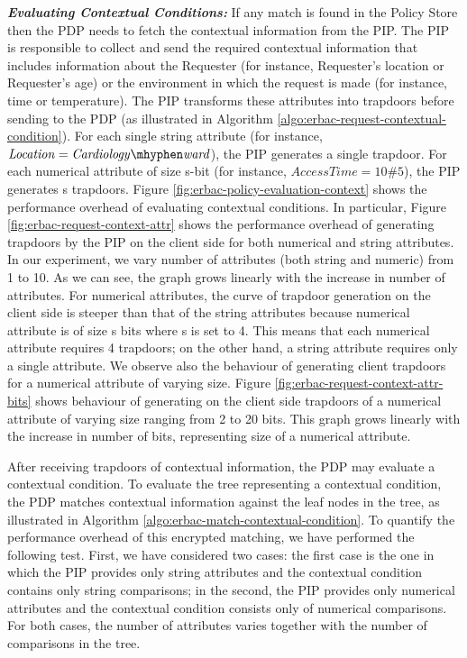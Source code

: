 \documentclass[epsfig,a4paper,11pt,titlepage]{book}
\numberwithin{algorithm}{chapter}
\begin{document}
\noindent \emph{\textbf{Evaluating Contextual Conditions:}}
If any match is found in the Policy Store then the \gls{PDP} needs to fetch the contextual information from the \gls{PIP}. The \gls{PIP} is responsible to collect and send the required contextual information that includes information about the Requester (for instance, Requester's location or Requester's age) or the environment in which the request is made (for instance, time or temperature). The \gls{PIP} transforms these attributes into trapdoors before sending to the \gls{PDP} (as illustrated in Algorithm \ref{algo:erbac-request-contextual-condition}). For each single string attribute (for instance, $\mathit{Location=Cardiology \mhyphen ward}$), the \gls{PIP} generates a single trapdoor. For each numerical attribute of size s-bit (for instance, $\mathit{Access Time = 10\#5}$), the \gls{PIP} generates s trapdoors. Figure \ref{fig:erbac-policy-evaluation-context} shows the performance overhead of evaluating contextual conditions. In particular, Figure \ref{fig:erbac-request-context-attr} shows the performance overhead of generating trapdoors by the \gls{PIP} on the client side for both numerical and string attributes. In our experiment, we vary number of attributes (both string and numeric) from 1 to 10. As we can see, the graph grows linearly with the increase in number of attributes. For numerical attributes, the curve of trapdoor generation on the client side is steeper than that of the string attributes because numerical attribute is of size s bits where s is set to 4. This means that each numerical attribute requires 4 trapdoors; on the other hand, a string attribute requires only a single attribute. We observe also the behaviour of generating client trapdoors for a numerical attribute of varying size. Figure \ref{fig:erbac-request-context-attr-bits} shows behaviour of generating on the client side trapdoors of a numerical attribute of varying size ranging from 2 to 20 bits. This graph grows linearly with the increase in number of bits, representing size of a numerical attribute.

After receiving trapdoors of contextual information, the \gls{PDP} may evaluate a contextual condition. To evaluate the tree representing a contextual condition, the \gls{PDP} matches contextual information against the leaf nodes in the tree, as illustrated in Algorithm \ref{algo:erbac-match-contextual-condition}. To quantify the performance overhead of this encrypted matching, we have performed the following test. First, we have considered two cases: the first case is the one in which the \gls{PIP} provides only string attributes and the contextual condition contains only string comparisons; in the second, the \gls{PIP} provides only numerical attributes and the contextual condition consists only of numerical comparisons. For both cases, the number of attributes varies together with the number of comparisons in the tree. 
\end{document}

